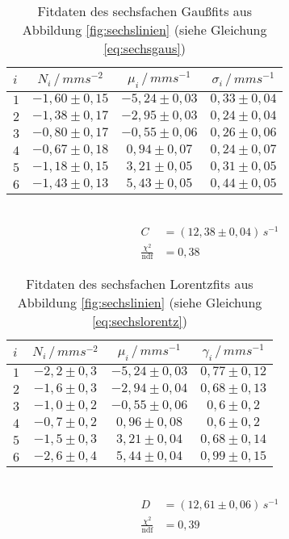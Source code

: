 \begin{table}[h!]
	\centering
	\begin{tabular}{l|ccc}
		$i$&$N_i\,/\,\si{mms^{-2}}$&$\mu_i\,/\,\si{mms^{-1}}$&$\sigma_i\,/\,\si{mms^{-1}}$\\\hline
		$1$&$-1,60\pm0,15$&$-5,24\pm0,03$&$0,33\pm0,04$\\
		$2$&$-1,38\pm0,17$&$-2,95\pm0,03$&$0,24\pm0,04$\\
		$3$&$-0,80\pm0,17$&$-0,55\pm0,06$&$0,26\pm0,06$\\
		$4$&$-0,67\pm0,18$&$ 0,94\pm0,07$&$0,24\pm0,07$\\
		$5$&$-1,18\pm0,15$&$ 3,21\pm0,05$&$0,31\pm0,05$\\
		$6$&$-1,43\pm0,13$&$ 5,43\pm0,05$&$0,44\pm0,05$\\
	\end{tabular}\\
	\begin{align*}
		C&=(12,38\pm0,04)\,\si{s^{-1}}\\
		\frac{\chi^2}{\mathrm{ndf}}&=0,38
	\end{align*}
	\caption{Fitdaten des sechsfachen Gaußfits aus Abbildung \ref{fig:sechslinien} (siehe Gleichung \ref{eq:sechsgaus})}
	\label{tab:sechsgaus}
\end{table}

\begin{table}[h!]
	\centering
	\begin{tabular}{l|ccc}
		$i$&$N_i\,/\,\si{mms^{-2}}$&$\mu_i\,/\,\si{mms^{-1}}$&$\gamma_i\,/\,\si{mms^{-1}}$\\\hline
		$1$&$-2,2\pm0,3$&$-5,24\pm0,03$&$0,77\pm0,12$\\
		$2$&$-1,6\pm0,3$&$-2,94\pm0,04$&$0,68\pm0,13$\\
		$3$&$-1,0\pm0,2$&$-0,55\pm0,06$&$0,6 \pm0,2$\\
		$4$&$-0,7\pm0,2$&$ 0,96\pm0,08$&$0,6 \pm0,2$\\
		$5$&$-1,5\pm0,3$&$ 3,21\pm0,04$&$0,68\pm0,14$\\
		$6$&$-2,6\pm0,4$&$ 5,44\pm0,04$&$0,99\pm0,15$\\
	\end{tabular}\\
	\begin{align*}
	D&=(12,61\pm0,06)\,\si{s^{-1}}\\
	\frac{\chi^2}{\mathrm{ndf}}&=0,39
	\end{align*}
	\caption{Fitdaten des sechsfachen Lorentzfits aus Abbildung \ref{fig:sechslinien} (siehe Gleichung \ref{eq:sechslorentz})}
	\label{tab:sechslorentz}
\end{table}

